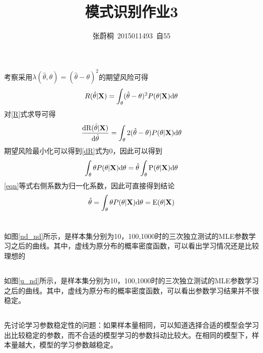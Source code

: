 \documentclass[UTF8,a4paper]{ctexart}
\title{模式识别作业3}
\author{张蔚桐\ 2015011493\ 自55}
\begin{document}
\maketitle
\section{}
考察采用$\lambda(\hat{\theta},\theta)=(\hat{\theta}-\theta)^2$的期望风险可得
\begin{equation}
R(\hat{\theta}|\mathbf{X})=\int_\theta(\hat{\theta}-\theta)^2P(\theta|\mathbf{X})\rm{d}\theta
\label{R}
\end{equation}
 对\ref{R}式求导可得
\begin{equation}
\frac{\rm{d}R(\hat{\theta}|\mathbf{X})}{\rm{d}\hat{\theta}}=\int_\theta2(\hat{\theta}-\theta)P(\theta|\mathbf{X})\rm{d}\theta
\label{dR}
\end{equation}
期望风险最小化可以得到\ref{dR}式为0，因此可以得到
\begin{equation}
\int_\theta\theta P(\theta|\mathbf{X})\rm{d}\theta=\hat{\theta} \int_\theta{P(\theta|\mathbf{X})\rm{d}\theta}
\label{eqn}
\end{equation}
\ref{eqn}等式右侧系数为归一化系数，因此可直接得到结论
\begin{equation}
\hat{\theta}=\int_\theta\theta P(\theta|\mathbf{X})\rm{d}\theta=E(\theta|\mathbf{X})
\label{eqn}
\end{equation}
\section{}
\subsection{}
如图\ref{nd_nd}所示，是样本集分别为10，100,1000时的三次独立测试的MLE参数学习之后的曲线。其中，虚线为原分布的概率密度函数，可以看出学习情况还是比较理想的
\subsection{}
如图\ref{u_nd}所示，是样本集分别为10，100,1000时的三次独立测试的MLE参数学习之后的曲线。其中，虚线为原分布的概率密度函数，可以看出参数学习结果并不很稳定。
\subsection{}
先讨论学习参数稳定性的问题：如果样本量相同，可以知道选择合适的模型会学习出比较稳定的参数，而不合适的模型学习的参数抖动比较大。在相同的模型下，样本量越大，模型的学习参数越稳定。
\end{document}
